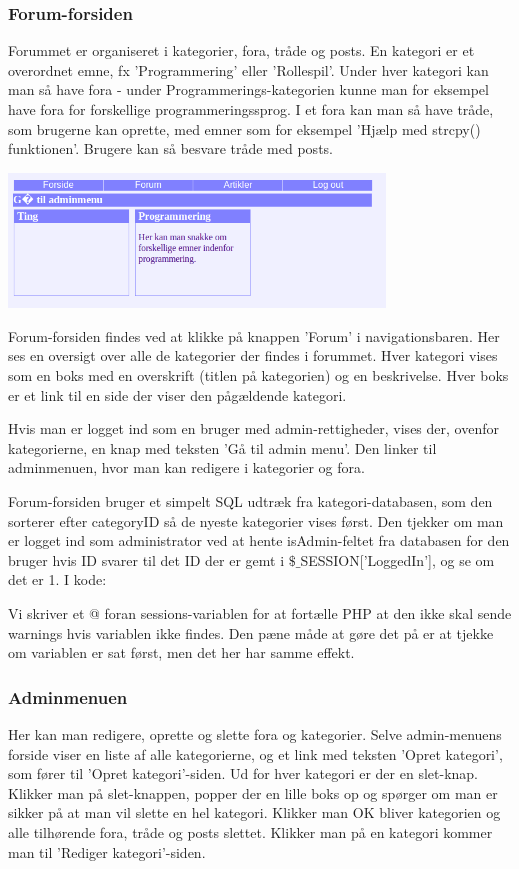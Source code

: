 \documentclass{article}
\begin{document}
\subsubsection{Forum-forsiden}
Forummet er organiseret i kategorier, fora, tråde og posts. En kategori er et overordnet emne, fx 'Programmering' eller 'Rollespil'. Under hver kategori kan man så have fora - under Programmerings-kategorien kunne man for eksempel have fora for forskellige programmeringssprog. I et fora kan man så have tråde, som brugerne kan oprette, med emner som for eksempel 'Hjælp med strcpy() funktionen'. Brugere kan så besvare tråde med posts.

\includegraphics[width=100mm]{mi06.png}

Forum-forsiden findes ved at klikke på knappen 'Forum' i navigationsbaren. Her ses en oversigt over alle de kategorier der findes i forummet. Hver kategori vises som en boks med en overskrift (titlen på kategorien) og en beskrivelse. Hver boks er et link til en side der viser den pågældende kategori.

Hvis man er logget ind som en bruger med admin-rettigheder, vises der, ovenfor kategorierne, en knap med teksten 'Gå til admin menu'. Den linker til adminmenuen, hvor man kan redigere i kategorier og fora.

Forum-forsiden bruger et simpelt SQL udtræk fra kategori-databasen, som den sorterer efter categoryID så de nyeste kategorier vises først. Den tjekker om man er logget ind som administrator ved at hente isAdmin-feltet fra databasen for den bruger hvis ID svarer til det ID der er gemt i $\$$$\_$SESSION['LoggedIn'], og se om det er 1. I kode:



Vi skriver et @ foran sessions-variablen for at fortælle PHP at den ikke skal sende warnings hvis variablen ikke findes. Den pæne måde at gøre det på er at tjekke om variablen er sat først, men det her har samme effekt.

\subsubsection{Adminmenuen}
Her kan man redigere, oprette og slette fora og kategorier. Selve admin-menuens forside viser en liste af alle kategorierne, og et link med teksten 'Opret kategori', som fører til 'Opret kategori'-siden. Ud for hver kategori er der en slet-knap. Klikker man på slet-knappen, popper der en lille boks op og spørger om man er sikker på at man vil slette en hel kategori. Klikker man OK bliver kategorien og alle tilhørende fora, tråde og posts slettet. Klikker man på en kategori kommer man til 'Rediger kategori'-siden. 
\end{document}
